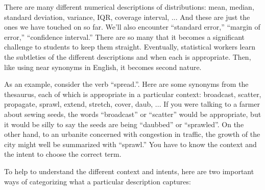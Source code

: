 There are many different numerical descriptions of distributions:
mean, median, standard deviation, variance, IQR, coverage interval,
...   And these are just the ones we have touched on so far.  We'll
also encounter ``standard error,''  ``margin of error,''  ``confidence
interval.''  There are so
many that it becomes a significant challenge to students to keep them
straight.  Eventually, statistical workers learn the subtleties of the
different descriptions and when each is appropriate.  Then, like using
near synonyms in English, it becomes second nature.  

As an example,
consider the verb ``spread.''.  Here are some
synonyms from the thesaurus, each of which is appropriate in a particular context:
broadcast, scatter, propagate, sprawl, extend, stretch, cover, daub, ...  If you
were talking to a farmer about sewing seeds, the words ``broadcast''
or ``scatter'' would be appropriate, but it would be silly to say the
seeds are being ``daubbed'' or ``sprawled''.  On the other hand, to an urbanite
concerned with congestion in traffic, the growth of the city might
well be summarized with ``sprawl.''  You have to know the context and
the intent to choose the correct term.  

To help to understand the different context and intents, here are
two important ways of categorizing what a particular description captures:

